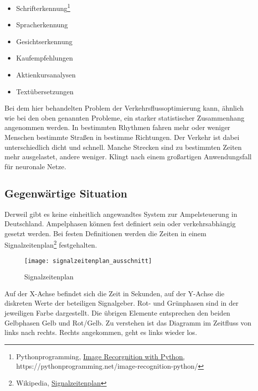 \begin{multicols}{2}
\begin{itemize}
    \item Schrifterkennung\footnote{Pythonprogramming, \href{https://pythonprogramming.net/image-recognition-python/}{Image Recorgnition with Python,}\\https://pythonprogramming.net/image-recognition-python/} %
  \item Spracherkennung
  \item Gesichtserkennung
  \item Kaufempfehlungen
  \item Aktienkursanalysen
  \item Textübersetzungen
\end{itemize}
\end{multicols}

Bei dem hier behandelten Problem der Verkehrsflussoptimierung kann, ähnlich wie bei den oben genannten Probleme, ein starker statistischer Zusammenhang angenommen werden. In bestimmten Rhythmen fahren mehr oder weniger Menschen bestimmte Straßen in bestimme Richtungen. Der Verkehr ist dabei unterschiedlich dicht und schnell. Manche Strecken sind zu bestimmten Zeiten mehr ausgelastet, andere weniger. Klingt nach einem großartigen Anwendungsfall für neuronale Netze.

\subsection{Gegenwärtige Situation}

Derweil gibt es keine einheitlich angewandtes System zur Ampelsteuerung in Deutschland. Ampelphasen können fest definiert sein oder verkehrsabhängig gesetzt werden. Bei festen Definitionen werden die Zeiten in einem Signalzeitenplan\footnote{Wikipedia, \href{https://de.wikipedia.org/wiki/Signalzeitenplan}{Signalzeitenplan}} festgehalten.

\begin{figure}[H]
    \centering
    \texttt{[image: signalzeitenplan\_ausschnitt]}
    \caption{Signalzeitenplan}
    \label{fig:signalzeitenplan}
\end{figure}

Auf der X-Achse befindet sich die Zeit in Sekunden, auf der Y-Achse die diskreten Werte der beteiligen Signalgeber. Rot- und Grünphasen sind in der jeweiligen Farbe dargestellt. Die übrigen Elemente entsprechen den beiden Gelbphasen Gelb und Rot/Gelb. Zu verstehen ist das Diagramm im Zeitfluss von links nach rechts. Rechts angekommen, geht es links wieder los.


